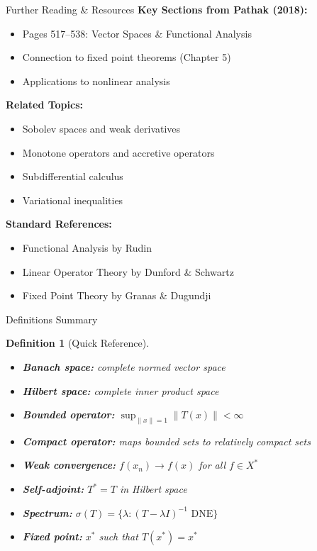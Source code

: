 \documentclass[aspectratio=169,10pt]{beamer}
\newtheorem{defn}{Definition}
\begin{document}
\begin{frame}{Further Reading \& Resources}
  \textbf{Key Sections from Pathak (2018):}
  \begin{itemize}
    \item Pages 517--538: Vector Spaces \& Functional Analysis
    \item Connection to fixed point theorems (Chapter 5)
    \item Applications to nonlinear analysis
  \end{itemize}

  \vspace{0.3cm}
  \textbf{Related Topics:}
  \begin{itemize}
    \item Sobolev spaces and weak derivatives
    \item Monotone operators and accretive operators
    \item Subdifferential calculus
    \item Variational inequalities
  \end{itemize}

  \vspace{0.3cm}
  \textbf{Standard References:}
  \begin{itemize}
    \item Functional Analysis by Rudin
    \item Linear Operator Theory by Dunford \& Schwartz
    \item Fixed Point Theory by Granas \& Dugundji
  \end{itemize}
\end{frame}

\begin{frame}[allowframebreaks]{Definitions Summary}
  \begin{defn}[Quick Reference]
    \begin{itemize}
      \item \textbf{Banach space:} complete normed vector space
      \item \textbf{Hilbert space:} complete inner product space
      \item \textbf{Bounded operator:} $\sup_{\|x\|=1} \|T(x)\| < \infty$
      \item \textbf{Compact operator:} maps bounded sets to relatively compact sets
      \item \textbf{Weak convergence:} $f(x_n) \to f(x)$ for all $f \in X^*$
      \item \textbf{Self-adjoint:} $T^* = T$ in Hilbert space
      \item \textbf{Spectrum:} $\sigma(T) = \{\lambda : (T-\lambda I)^{-1} \text{ DNE}\}$
      \item \textbf{Fixed point:} $x^*$ such that $T(x^*) = x^*$
    \end{itemize}
  \end{defn}
\end{frame}
\end{document}
